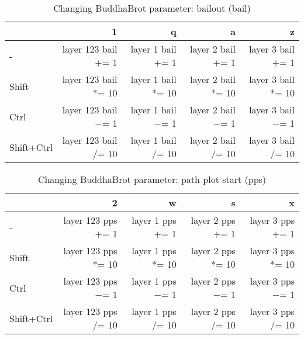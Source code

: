 \documentclass[10pt,a4paper]{article}
\begin{document}
\begin{table}[h!]
    \caption{Changing BuddhaBrot parameter: bailout (bail)}
    \setlength{\tabcolsep}{0.0pt}
    \begin{tabularx}{\linewidth}{lRRRR}
        \toprule
                   & 1                      & q                    & a                    & z                    \\
        \midrule                                                                          
        -          & layer 123 bail $+$= 1  & layer 1 bail $+$= 1  & layer 2 bail $+$= 1  & layer 3 bail $+$= 1  \\
        Shift      & layer 123 bail $*$= 10 & layer 1 bail $*$= 10 & layer 2 bail $*$= 10 & layer 3 bail $*$= 10 \\
        Ctrl       & layer 123 bail $-$= 1  & layer 1 bail $-$= 1  & layer 2 bail $-$= 1  & layer 3 bail $-$= 1  \\
        Shift+Ctrl & layer 123 bail $/$= 10 & layer 1 bail $/$= 10 & layer 2 bail $/$= 10 & layer 3 bail $/$= 10 \\
        \bottomrule
    \end{tabularx}
\end{table}

\begin{table}[h!]
    \caption{Changing BuddhaBrot parameter: path plot start (pps)}
    \setlength{\tabcolsep}{0.0pt}
    \begin{tabularx}{\linewidth}{lRRRR}
        \toprule
                   & 2                      & w                    & s                    & x                    \\
        \midrule                                                                          
        -          & layer 123 pps $+$= 1  & layer 1 pps $+$= 1  & layer 2 pps $+$= 1  & layer 3 pps $+$= 1  \\
        Shift      & layer 123 pps $*$= 10 & layer 1 pps $*$= 10 & layer 2 pps $*$= 10 & layer 3 pps $*$= 10 \\
        Ctrl       & layer 123 pps $-$= 1  & layer 1 pps $-$= 1  & layer 2 pps $-$= 1  & layer 3 pps $-$= 1  \\
        Shift+Ctrl & layer 123 pps $/$= 10 & layer 1 pps $/$= 10 & layer 2 pps $/$= 10 & layer 3 pps $/$= 10 \\
        \bottomrule
    \end{tabularx}
\end{table}
\end{document}
